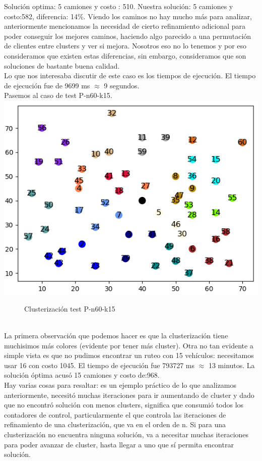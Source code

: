 \documentclass[11pt,a4paper]{article}
\begin{document}
Solución optima: 5 camiones y costo : 510. Nuestra solución: 5 camiones y costo:582, diferencia: 14\%. Viendo los caminos no hay mucho más para analizar, anteriormente mencionamos la necesidad de cierto refinamiento adicional para poder conseguir los mejores caminos, haciendo algo parecido a una permutación de clientes entre clusters y ver si mejora. Nosotros eso no lo tenemos y por eso consideramos que existen estas diferencias, sin embargo, consideramos que son soluciones de bastante buena calidad.\\Lo que nos interesaba discutir de este caso es los tiempos de ejecución. El tiempo de ejecución fue de 9699 ms $\approx$ 9 segundos. 
\\ \bigskip
Pasemos al caso de test P-n60-k15.
\\
\includegraphics[scale=.5]{graficos/P-n60-k15/cluster.png}
\begin{figure}[!h]
\caption{Clusterización test P-n60-k15}
\end{figure}
\\
La primera observación que podemos hacer es que la clusterización tiene muchisimos más colores (evidente por tener más cluster). Otra no tan evidente a simple vista es que no pudimos encontrar un ruteo con 15 vehículos: necesitamos usar 16 con costo 1045. El tiempo de ejecución fue 793727 ms $\approx$ 13 minutos. La solución óptima acusó 15 camiones y costo de:968.\\ 
Hay varias cosas para resaltar: es un ejemplo práctico de lo que analizamos anteriormente, necesitó muchas iteraciones para ir aumentando de cluster y dado que no encontró solución con menos clusters, significa que consumió todos los contadores de control, particularmente el que controla las iteraciones de refinamiento de una clusterización, que va en el orden de n. Si para una clusterización no encuentra ninguna solución, va a necesitar muchas iteraciones para poder avanzar de cluster, hasta llegar a uno que sí permita encontrar solución.\\
\end{document}

